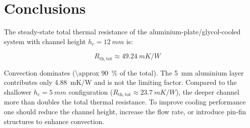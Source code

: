 \documentclass[a4paper,11pt]{article}
\begin{document}
\section{Conclusions}

The steady-state total thermal resistance of the aluminium-plate/glycol-cooled
system with channel height $h_c = \SI{12}{mm}$ is:

\begin{equation}
  R_{\mathrm{th,tot}} \approx \SI{49.24}{mK/W}
\end{equation}

Convection dominates (\SI{\approx 90}{\percent} of the total). The \SI{5}{mm}
aluminium layer contributes only \SI{4.88}{mK/W} and is not the limiting factor.
Compared to the shallower $h_c = \SI{5}{mm}$ configuration
($R_{\mathrm{th,tot}}\approx\SI{23.7}{mK/W}$), the deeper channel more than doubles
the total thermal resistance. To improve cooling performance one should reduce the
channel height, increase the flow rate, or introduce pin-fin structures to enhance
convection.
\end{document}

